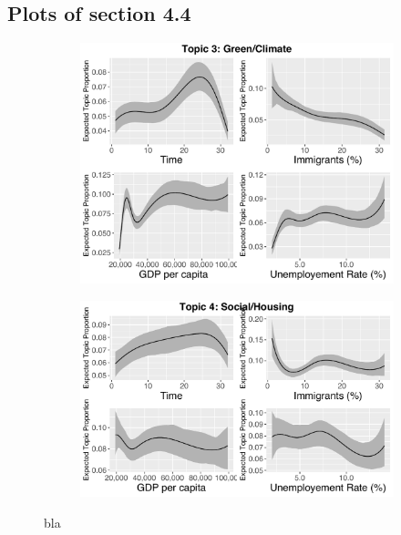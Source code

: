 \subsection*{Plots of section 4.4}

\begin{figure}[h!]
  \centering
  \begin{subfigure}[b]{0.4\linewidth}
    \includegraphics[width=\linewidth]{../plots/appendix/4_4/beta_t3_cont.pdf}
  \end{subfigure}
  \begin{subfigure}[b]{0.4\linewidth}
    \includegraphics[width=\linewidth]{../plots/appendix/4_4/beta_t4_cont.pdf}
  \end{subfigure}
  \caption{bla}
  \label{fig:coffee}
\end{figure}

